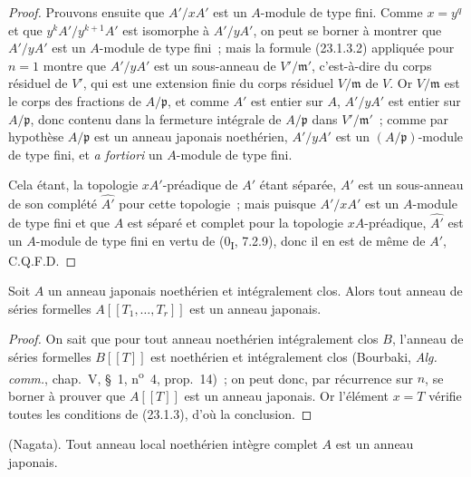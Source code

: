 \begin{proof}
Prouvons ensuite que $A'/xA'$ est un $A$-module de type fini. Comme $x=y^q$
et que $y^kA'/y^{k+1}A'$ est isomorphe à $A'/yA'$, on peut se borner à
montrer que $A'/yA'$ est un $A$-module de type fini~; mais la formule
(23.1.3.2) appliquée pour $n=1$ montre que $A'/yA'$ est un sous-anneau de
$V'/\mathfrak m'$, c'est-à-dire du corps résiduel de $V'$, qui est une
extension finie du corps résiduel $V/\mathfrak m$ de $V$. Or
$V/\mathfrak m$ est le corps des fractions de $A/\mathfrak p$, et comme
$A'$ est entier sur $A$, $A'/yA'$ est entier sur $A/\mathfrak p$, donc
contenu dans la fermeture intégrale de $A/\mathfrak p$ dans
$V'/\mathfrak m'$~; comme par hypothèse $A/\mathfrak p$ est un anneau
japonais noethérien, $A'/yA'$ est un $(A/\mathfrak p)$-module de type fini,
et \emph{a fortiori} un $A$-module de type fini.

Cela étant, la topologie $xA'$-préadique de $A'$ étant séparée, $A'$ est un
sous-anneau de son complété $\widehat{A'}$ pour cette topologie~; mais puisque
$A'/xA'$ est un $A$-module de type fini et que $A$ est séparé et complet pour
la topologie $xA$-préadique, $\widehat{A'}$ est un $A$-module de type fini en
vertu de (0\textsubscript{I}, 7.2.9), donc il en est de même de $A'$, C.Q.F.D.
\end{proof}

\begin{corollary}[23.1.4]
\label{0.23.1.4-fr}
Soit $A$ un anneau japonais noethérien et intégralement clos. Alors tout
anneau de séries formelles $A[[T_1,\ldots,T_r]]$ est un anneau japonais.
\end{corollary}

\begin{proof}
On sait que pour tout anneau noethérien intégralement clos $B$, l'anneau de
séries formelles $B[[T]]$ est noethérien et intégralement clos (Bourbaki,
\emph{Alg. comm.}, chap.~V, §~1, n\textsuperscript{o}~4, prop.~14)~; on peut
donc, par récurrence sur $n$, se borner à prouver que $A[[T]]$ est un anneau
japonais. Or l'élément $x=T$ vérifie toutes les conditions de (23.1.3), d'où
la conclusion.
\end{proof}

\begin{theorem}[23.1.5]
\label{0.23.1.5-fr}
\textnormal{(Nagata).} Tout anneau local noethérien intègre complet $A$ est
un anneau japonais.
\end{theorem}

